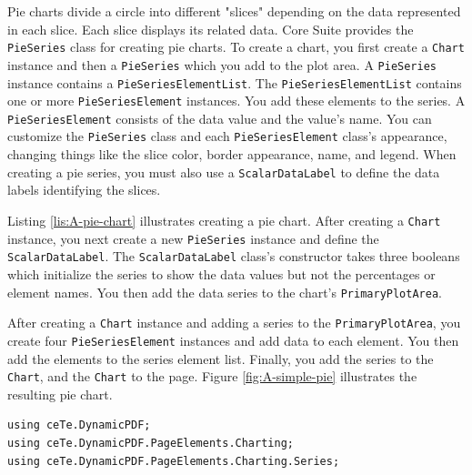 \documentclass[american,letterpaper]{tufte-book}
\numberwithin{equation}{section}
\numberwithin{figure}{section}
\begin{document}
{Pie charts divide a circle into different "slices" depending on
the data represented in each slice. Each slice displays its related
data. Core Suite provides the \texttt{PieSeries} class for creating
pie charts. To create a chart, you first create a \texttt{Chart} instance
and then a \texttt{PieSeries} which you add to the plot area. A \texttt{PieSeries}
instance contains a \texttt{PieSeriesElementList}. The \texttt{PieSeriesElementList}
contains one or more \texttt{PieSeriesElement} instances. You add
these elements to the series. A \texttt{PieSeriesElement} consists
of the data value and the value's name. You can customize the \texttt{PieSeries}
class and each \texttt{PieSeriesElement} class's appearance, changing
things like the slice color, border appearance, name, and legend.
When creating a pie series, you must also use a \texttt{ScalarDataLabel}
to define the data labels identifying the slices. 

Listing \ref{lis:A-pie-chart} illustrates creating a pie chart. After
creating a \texttt{Chart} instance, you next create a new \texttt{PieSeries}
instance and define the \texttt{ScalarDataLabel}. The \texttt{ScalarDataLabel}
class's constructor takes three booleans which initialize the series
to show the data values but not the percentages or element names.
You then add the data series to the chart's \texttt{PrimaryPlotArea}. 

After creating a \texttt{Chart} instance and adding a series to the
\texttt{PrimaryPlotArea}, you create four \texttt{PieSeriesElement}
instances and add data to each element. You then add the elements to
the series element list. Finally, you add the series to the \texttt{Chart},
and the \texttt{Chart} to the page. Figure \ref{fig:A-simple-pie}
illustrates the resulting pie chart.

\bgroup{}
\begin{lstlisting}[caption={A pie chart example.},label={lis:A-pie-chart},basicstyle={\small\ttfamily},breaklines=true]
using ceTe.DynamicPDF;
using ceTe.DynamicPDF.PageElements.Charting;
using ceTe.DynamicPDF.PageElements.Charting.Series;


\end{lstlisting}}
\end{document}
